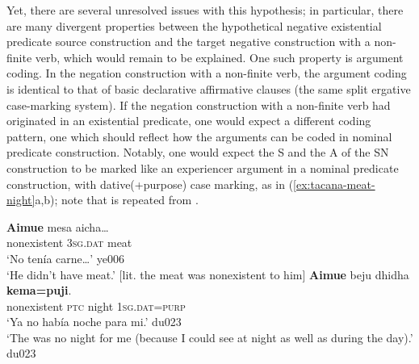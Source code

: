 \documentclass[output=paper]{langsci/langscibook}
\begin{document}
Yet, there are several unresolved issues with this hypothesis; in
particular, there are many divergent properties between the hypothetical
negative existential predicate source construction and the target negative
construction with a non-finite verb, which would remain to be explained.
One such property is argument coding.  In the negation construction with a
non-finite verb, the argument coding is identical to that of basic
declarative affirmative clauses (the same split ergative case-marking
system). If the negation construction with a
non-finite verb had originated in an existential predicate, one would
expect a different coding pattern, one which should reflect how the
arguments can be coded in nominal predicate construction. Notably, one
would expect the S and the A of the SN construction to be marked like an
experiencer argument in a nominal predicate construction, with
dative(+purpose) case marking, as in (\ref{ex:tacana-meat-night}a,b);
note that  is repeated from .
%
\begin{exe}\ex\label{ex:tacana-meat-night}
\begin{xlist}
\ex\label{ex:tacana-still-no-meat}
\gll {}\textbf{Aimue} mesa aicha…\\
    nonexistent  \textsc{3sg.dat}  meat\\
\glt `No tenía carne…' ye006\\
`He didn't have meat.' [lit. the meat was nonexistent to him]
\ex\label{ex:tacana-no-night}
\gll  \textbf{Aimue}  beju  dhidha  \textbf{kema=puji}.\\
    nonexistent  \textsc{ptc}  night  1\textsc{sg.dat=purp}\\
\glt `Ya no había noche para mi.' du023\\
`The was no night for me (because I could see at night as well as during the day).' du023
\end{xlist}\end{exe}
\end{document}
